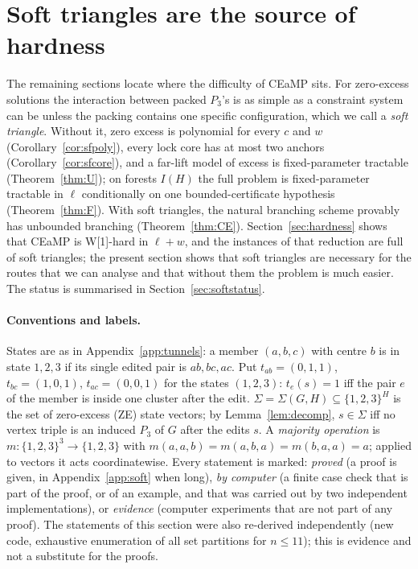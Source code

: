 \section{Soft triangles are the source of hardness}\label{sec:soft}
The remaining sections locate where the difficulty of CEaMP sits. For zero-excess solutions the interaction between packed $P_3$'s is as simple as a constraint system can be unless the packing contains one specific configuration, which we call a \emph{soft triangle}. Without it, zero excess is polynomial for every $c$ and $w$ (Corollary~\ref{cor:sfpoly}), every lock core has at most two anchors (Corollary~\ref{cor:sfcore}), and a far-lift model of excess is fixed-parameter tractable (Theorem~\ref{thm:U}); on forests $I(H)$ the full problem is fixed-parameter tractable in $\ell$ conditionally on one bounded-certificate hypothesis (Theorem~\ref{thm:F}). With soft triangles, the natural branching scheme provably has unbounded branching (Theorem~\ref{thm:CE}). Section~\ref{sec:hardness} shows that CEaMP is W[1]-hard in $\ell+w$, and the instances of that reduction are full of soft triangles; the present section shows that soft triangles are necessary for the routes that we can analyse and that without them the problem is much easier. The status is summarised in Section~\ref{sec:softstatus}.

\paragraph{Conventions and labels.}
States are as in Appendix~\ref{app:tunnels}: a member $(a,b,c)$ with centre $b$ is in state $1,2,3$ if its single edited pair is $ab,bc,ac$. Put $t_{ab}=(0,1,1)$, $t_{bc}=(1,0,1)$, $t_{ac}=(0,0,1)$ for the states $(1,2,3)$: $t_e(s)=1$ iff the pair $e$ of the member is inside one cluster after the edit. $\Sigma=\Sigma(G,H)\subseteq\{1,2,3\}^H$ is the set of zero-excess (ZE) state vectors; by Lemma~\ref{lem:decomp}, $s\in\Sigma$ iff no vertex triple is an induced $P_3$ of $G$ after the edits $s$. A \emph{majority operation} is $m:\{1,2,3\}^3\to\{1,2,3\}$ with $m(a,a,b)=m(a,b,a)=m(b,a,a)=a$; applied to vectors it acts coordinatewise. Every statement is marked: \emph{proved} (a proof is given, in Appendix~\ref{app:soft} when long), \emph{by computer} (a finite case check that is part of the proof, or of an example, and that was carried out by two independent implementations), or \emph{evidence} (computer experiments that are not part of any proof). The statements of this section were also re-derived independently (new code, exhaustive enumeration of all set partitions for $n\le 11$); this is evidence and not a substitute for the proofs.


